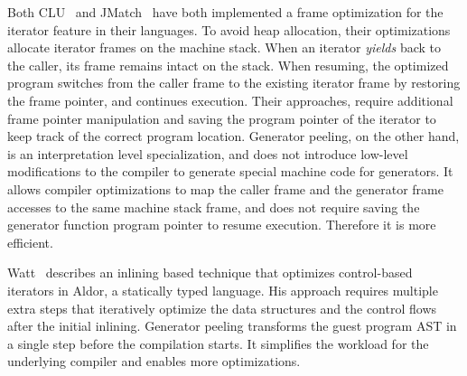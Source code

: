 Both CLU~\cite{Atkinson1978CLU} and JMatch~\cite{Liu:2006JMatch} have both implemented a frame optimization for the iterator feature in their languages.
To avoid heap allocation, their optimizations allocate iterator frames on the machine stack.
When an iterator \emph{yields} back to the caller, its frame remains intact on the stack.
When resuming, the optimized program switches from the caller frame to the existing iterator frame by restoring the frame pointer, and continues execution.
Their approaches, require additional frame pointer manipulation and saving the program pointer of the iterator to keep track of the correct program location.
Generator peeling, on the other hand, is an interpretation level specialization, and does not introduce low-level modifications to the compiler to generate special machine code for generators.
It allows compiler optimizations to map the caller frame and the generator frame accesses to the same machine stack frame, and does not require saving the generator function program pointer to resume execution.
Therefore it is more efficient.

Watt~\cite{watt2006technique} describes an inlining based technique that optimizes control-based iterators in Aldor, a statically typed language.
His approach requires multiple extra steps that iteratively optimize the data structures and the control flows after the initial inlining.
Generator peeling transforms the guest program AST in a single step before the compilation starts.
It simplifies the workload for the underlying compiler and enables more optimizations.
